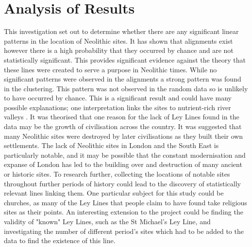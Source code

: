 \documentclass[a4paper]{article}
\begin{document}
\section{Analysis of Results}
This investigation set out to determine whether there are any significant linear patterns in the location of Neolithic sites. It has shown that alignments exist however there is a high probability that they occurred by chance and are not statistically significant. This provides significant evidence against the theory that these lines were created to serve a purpose in Neolithic times. While no significant patterns were observed in the alignments a strong pattern was found in the clustering. This pattern was not observed in the random data so is unlikely to have occurred by chance. This is a significant result and could have many possible explanations; one interpretation links the sites to nutrient-rich river valleys \cite{explanation}.  
\newline\newline
It was theorised that one reason for the lack of Ley Lines found in the data may be the growth of civilisation across the country. It was suggested that many Neolithic sites were destroyed by later civilisations as they built their own settlements. The lack of Neolithic sites in London and the South East is particularly notable, and it may be possible that the constant modernisation and expanse of London has led to the building over and destruction of many ancient or historic sites. 
\newline\newline
To research further, collecting the locations of notable sites throughout further periods of history could lead to the discovery of statistically relevant lines linking them. One particular subject for this study could be churches, as many of the Ley Lines that people claim to have found take religious sites as their points. An interesting extension to the project could be finding the validity of "known" Ley Lines, such as the St Michael's Ley Line, and investigating the number of different period's sites which had to be added to the data to find the existence of this line.
 
\end{document}
